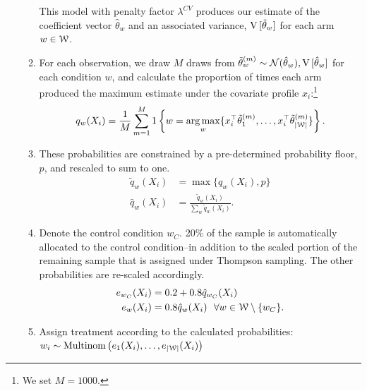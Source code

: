 \documentclass[letterpaper, 12pt, parskip=full,]{scrartcl}
\begin{document}
\begin{enumerate}
\begin{enumerate}
  
 This model with penalty factor $\lambda^{CV}$ produces our estimate of the coefficient vector $\hat \theta_w$ and an associated variance, ${\textrm V}\,[\hat\theta_{w}] $ for each arm $w\in {\EuScript W}$. 

 \item For each observation, we draw $M$ draws from $\tilde \theta ^{(m)}_w \sim \mathcal{N}(\hat \theta_w),{\textrm V}\,[\hat\theta_{w}]$ for each condition $w$, and calculate the proportion of times each arm produced the maximum estimate under the covariate profile $x_i$:\footnote{We set $M = 1000$.}
				\begin{align}
    q_w(X_i) = \frac{1}{M} \sum_{m=1}^M 1\left\{ w = \operatorname*{arg\,max}_w \{ x_i^\top \tilde \theta ^{(m)}_1, \dots, x_i^\top\tilde \theta_{|{\EuScript W}|}^{(m)} \}  \right\}.
				\end{align}
\item These probabilities are constrained by a pre-determined probability floor, $p$, and rescaled to sum to one. 
				\begin{align}
     \tilde{q}_w(X_i) & =\max\Biggr\{q_w{(X_i)}, p\Biggr\} \\
     \hat{q}_w(X_i)& = \frac{ \tilde{q}_w(X_i)}{\sum\limits_{w }\tilde{q}_w(X_i) }. 
				\end{align}
\item Denote the control condition $w_{C}$. 20\% of the sample is automatically allocated to the control condition--in addition to the scaled portion of the remaining sample that is assigned under Thompson sampling. The other probabilities are re-scaled accordingly. 
      \begin{align}
         e_{w_C}(X_i) & = 0.2 + 0.8\hat{q}_{w_C}(X_i) \\
          e_{w}(X_i) & = 0.8\hat{q}_w(X_i)\ \ \forall w \in {\EuScript W} \setminus \{w_C\}. 
      \end{align}
\item Assign treatment  according to the calculated probabilities: \\
$w_i \sim \textrm{Multinom} \left( e_{1}(X_i), \dots, e_{|{\EuScript W}|}(X_i)\right)$
\end{enumerate}


\end{enumerate}
\end{document}
